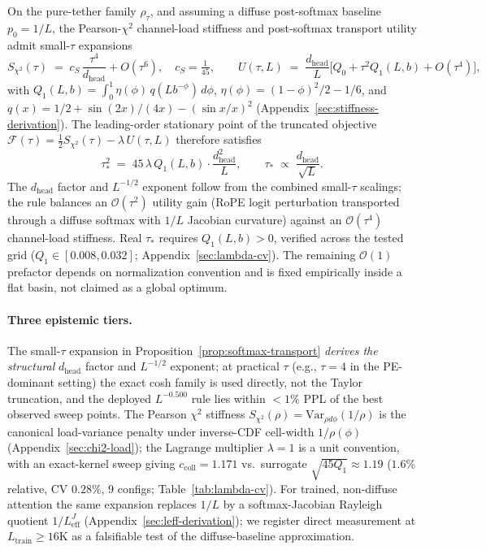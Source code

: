 \begin{proposition}
\label{prop:softmax-transport}
On the pure-tether family $\rho_\tau$, and assuming a diffuse post-softmax baseline $p_0{=}1/L$, the Pearson-$\chi^2$ channel-load stiffness and post-softmax transport utility admit small-$\tau$ expansions
\[
S_{\chi^2}(\tau) \;=\; c_S\,\frac{\tau^4}{d_{\mathrm{head}}} + O(\tau^6), \quad c_S{=}\tfrac{1}{45},
\qquad
U(\tau,L) \;=\; \frac{d_{\mathrm{head}}}{L}\bigl[Q_0 + \tau^2 Q_1(L,b) + O(\tau^4)\bigr],
\]
with $Q_1(L,b) = \int_0^1 \eta(\phi)\,q(Lb^{-\phi})\,d\phi$, $\eta(\phi) = (1{-}\phi)^2/2{-}1/6$, and $q(x) = 1/2 + \sin(2x)/(4x) - (\sin x/x)^2$ (Appendix~\ref{sec:stiffness-derivation}). The leading-order stationary point of the truncated objective $\mathcal{F}(\tau) = \tfrac{1}{2}S_{\chi^2}(\tau) - \lambda\,U(\tau,L)$ therefore satisfies
\[
\tau_*^2 \;=\; 45\,\lambda\,Q_1(L,b)\cdot\frac{d_{\mathrm{head}}^2}{L},
\qquad \tau_* \;\propto\; \frac{d_{\mathrm{head}}}{\sqrt{L}}.
\]
The $d_{\mathrm{head}}$ factor and $L^{-1/2}$ exponent follow from the combined small-$\tau$ scalings; the rule balances an $\mathcal{O}(\tau^2)$ utility gain (RoPE logit perturbation transported through a diffuse softmax with $1/L$ Jacobian curvature) against an $\mathcal{O}(\tau^4)$ channel-load stiffness. Real $\tau_*$ requires $Q_1(L,b){>}0$, verified across the tested grid ($Q_1{\in}[0.008, 0.032]$; Appendix~\ref{sec:lambda-cv}). The remaining $\mathcal{O}(1)$ prefactor depends on normalization convention and is fixed empirically inside a flat basin, not claimed as a global optimum.
\end{proposition}

\paragraph{Three epistemic tiers.}
\label{sec:leff-remark}
The small-$\tau$ expansion in Proposition~\ref{prop:softmax-transport} \emph{derives the structural} $d_{\mathrm{head}}$ factor and $L^{-1/2}$ exponent; at practical $\tau$ (e.g., $\tau{=}4$ in the PE-dominant setting) the exact cosh family is used directly, not the Taylor truncation, and the deployed $L^{-0.500}$ rule lies within $<1\%$ PPL of the best observed sweep points. The Pearson $\chi^2$ stiffness $S_{\chi^2}(\rho){=}\mathrm{Var}_{\rho d\phi}(1/\rho)$ is the canonical load-variance penalty under inverse-CDF cell-width $1/\rho(\phi)$ (Appendix~\ref{sec:chi2-load}); the Lagrange multiplier $\lambda{=}1$ is a unit convention, with an exact-kernel sweep giving $c_{\mathrm{coll}}{=}1.171$ vs.\ surrogate $\sqrt{45Q_1}{\approx}1.19$ ($1.6\%$ relative, CV $0.28\%$, 9 configs; Table~\ref{tab:lambda-cv}). For trained, non-diffuse attention the same expansion replaces $1/L$ by a softmax-Jacobian Rayleigh quotient $1/L_{\mathrm{eff}}^{J}$ (Appendix~\ref{sec:leff-derivation}); we register direct measurement at $L_{\mathrm{train}}{\geq}16$K as a falsifiable test of the diffuse-baseline approximation.

